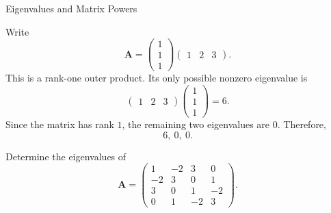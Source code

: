\begin{expectedproblemgroup}{Eigenvalues and Matrix Powers}
        \begin{expectedsubsolution}
            Write
            \[
                \mathbf{A}
                =
                \begin{pmatrix}
                    1\\1\\1
                \end{pmatrix}
                \begin{pmatrix}
                    1&2&3
                \end{pmatrix}.
            \]
            This is a rank-one outer product. Its only possible nonzero
            eigenvalue is
            \[
                \begin{pmatrix}
                    1&2&3
                \end{pmatrix}
                \begin{pmatrix}
                    1\\1\\1
                \end{pmatrix}
                =
                6.
            \]
            Since the matrix has rank $1$, the remaining two eigenvalues are
            $0$. Therefore,
            \[
                \boxed{6,\ 0,\ 0}.
            \]
        \end{expectedsubsolution}

        \begin{expectedsubproblem}
            Determine the eigenvalues of
            \[
                \mathbf{A}
                =
                \begin{pmatrix}
                    1 & -2 & 3 & 0\\
                    -2 & 3 & 0 & 1\\
                    3 & 0 & 1 & -2\\
                    0 & 1 & -2 & 3
                \end{pmatrix}.
            \]
        \end{expectedsubproblem}


\end{expectedproblemgroup}
